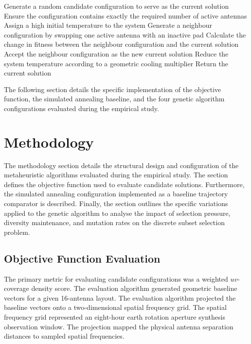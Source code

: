 \documentclass[conference]{IEEEtran}
\begin{document}
\begin{algorithm}[htbp]
\caption{Simulated Annealing utilising a geometric cooling schedule.}
\begin{algorithmic}[1]
\State Generate a random candidate configuration to serve as the current solution
\State Ensure the configuration contains exactly the required number of active antennas
\State Assign a high initial temperature to the system
    \State Generate a neighbour configuration by swapping one active antenna with an inactive pad
    \State Calculate the change in fitness between the neighbour configuration and the current solution
        \State Accept the neighbour configuration as the new current solution
    \EndIf
    \State Reduce the system temperature according to a geometric cooling multiplier
\EndWhile
\State Return the current solution
\end{algorithmic}
\end{algorithm}

The following section details the specific implementation of the objective function, the 
simulated annealing baseline, and the four genetic algorithm configurations evaluated 
during the empirical study.
\section{Methodology}

The methodology section details the structural design and configuration of the metaheuristic algorithms evaluated during the 
empirical study. The section defines the objective function used to evaluate candidate solutions. Furthermore, the simulated 
annealing configuration implemented as a baseline trajectory comparator is described. Finally, the section outlines the specific 
variations applied to the genetic algorithm to analyse the impact of selection pressure, diversity maintenance, and mutation rates 
on the discrete subset selection problem.

\subsection{Objective Function Evaluation}
The primary metric for evaluating candidate configurations was a weighted $uv$-coverage density score. 
The evaluation algorithm generated geometric baseline vectors for a given 16-antenna layout. 
The evaluation algorithm projected the baseline vectors onto a two-dimensional spatial frequency grid. 
The spatial frequency grid represented an eight-hour earth rotation aperture synthesis observation window. 
The projection mapped the physical antenna separation distances to sampled spatial frequencies.
\end{document}
